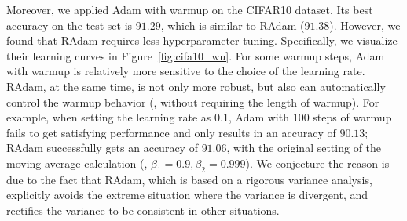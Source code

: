 Moreover, we applied Adam with warmup on the CIFAR10 dataset. 
Its best accuracy on the test set is $91.29$, which is similar to RAdam ($91.38$). 
However, we found that RAdam requires less hyperparameter tuning. 
Specifically, we visualize their learning curves in Figure~\ref{fig:cifa10_wu}.
For some warmup steps, Adam with warmup is relatively more sensitive to the choice of the learning rate. 
RAdam, at the same time, is not only more robust, but also can automatically control the warmup behavior (\ie, without requiring the length of warmup). 
For example, when setting the learning rate as $0.1$, Adam with 100 steps of warmup fails to get satisfying performance and only results in an accuracy of $90.13$; RAdam successfully gets an accuracy of $91.06$, with the original setting of the moving average calculation (\ie, $\beta_1 = 0.9, \beta_2 = 0.999$). 
We conjecture the reason is due to the fact that RAdam, which is based on a rigorous variance analysis, explicitly avoids the extreme situation where the variance is divergent, and rectifies the variance to be consistent in other situations. 






